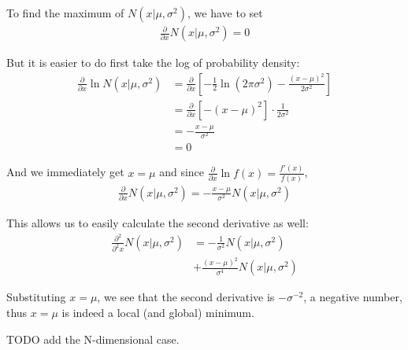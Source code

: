 \begin{problem}
  To find the maximum of $N(x | \mu, \sigma^2)$, we have to set
  \begin{align*}
    \frac{\partial}{\partial x} N(x | \mu, \sigma^2) = 0
  \end{align*}

  But it is easier to do first take the log of probability density:
  \begin{align*}
    \frac{\partial}{\partial x} \ln N(x | \mu, \sigma^2) &=
    \frac{\partial}{\partial x} \left[ -\frac{1}{2} \ln (2 \pi \sigma^2) - \frac{(x - \mu)^2}{2 \sigma^2} \right] \\
    &= \frac{\partial}{\partial x} \left[ - (x - \mu)^2 \right] \cdot \frac{1}{2 \sigma^2} \\
    &= -\frac{x - \mu}{\sigma^2} \\
    &= 0
  \end{align*}

  And we immediately get $x = \mu$ and since $\frac{\partial}{\partial x}\ln f(x) = \frac{f'(x)}{f(x)}$,
  \begin{align*}
    \frac{\partial}{\partial x} N(x | \mu, \sigma^2) = -\frac{x - \mu}{\sigma^2} N(x | \mu, \sigma^2)
  \end{align*}

  This allows us to easily calculate the second derivative as well:
  \begin{align*}
    \frac{\partial^2}{\partial^2 x} N(x | \mu, \sigma^2)
        &= -\frac{1}{\sigma^2} N(x | \mu, \sigma^2) \\
        &+ \frac{(x - \mu)^2}{\sigma^4} N(x | \mu, \sigma^2)
  \end{align*}

  Substituting $x = \mu$, we see that the second derivative is $-\sigma^{-2}$,
  a negative number, thus $x = \mu$ is indeed a local (and global) minimum.

  TODO add the N-dimensional case.
\end{problem}


